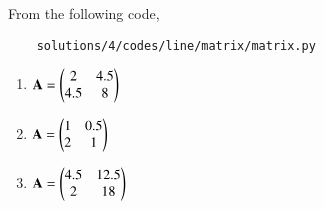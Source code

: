 From the following code, 
	\begin{lstlisting}
	solutions/4/codes/line/matrix/matrix.py
	\end{lstlisting} 
\begin{enumerate}

\item $	\mathbf {A} = \begin{pmatrix}2 & 4.5\\4.5 & 8\end{pmatrix}$
\item $	\mathbf A = \begin{pmatrix}1 & 0.5\\2 & 1\end{pmatrix}$
\item $	\mathbf A = \begin{pmatrix}4.5 & 12.5\\2 & 18\end{pmatrix}$
\end{enumerate}
